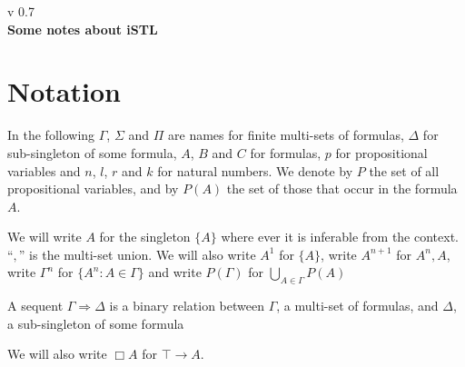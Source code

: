 \documentclass[a4paper, 12pt]{paper}
\begin{document}
{\noindent
	v 0.7 \\
{\large\textbf{Some notes about iSTL}}
}
\\
\setcounter{section}{-1}
\section{Notation} In the following $\Gamma$, $\Sigma$ and $\Pi$ are names for finite multi-sets of formulas, $\Delta$ for sub-singleton of some formula, $A$, $B$ and $C$ for formulas, $p$ for propositional variables and $n$, $l$, $r$ and $k$ for natural numbers. We denote by $P$ the set of all propositional variables, and by $P(A)$ the set of those that occur in the formula $A$.

We will write $A$ for the singleton $\{A\}$ where ever it is inferable from the context.
``$,$'' is the multi-set union.
We will also write $A^1$ for $\{A\}$, write $A^{n+1}$ for $A^n, A$, write $\Gamma^n$ for $\{ A^n : A \in \Gamma \}$ and write $P(\Gamma)$ for $\bigcup_{A \in \Gamma} P(A)$

A sequent $\Gamma \Rightarrow \Delta$ is a binary relation between $\Gamma$, a multi-set of formulas, and $\Delta$, a sub-singleton of some formula

We will also write $\Box A$ for $\top \rightarrow A$.










\end{document}
